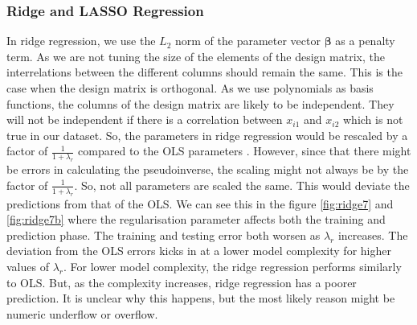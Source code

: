 \subsubsection{Ridge and LASSO Regression}
In ridge regression, we use the $L_2$ norm of the parameter vector $\boldsymbol \beta$ as a penalty term. As we are not tuning the size of the elements of the design matrix, the interrelations between the different columns should remain the same. This is the case when the design matrix is orthogonal. As we use polynomials as basis functions, the columns of the design matrix are likely to be independent. They will not be independent if there is a correlation between $x_{i1}$ and $x_{i2}$ which is not true in our dataset. So, the parameters in ridge regression would be rescaled by a factor of $\frac{1}{1+\lambda_r}$ compared to the OLS parameters \cite{mehta2019high}. However, since that there might be errors in calculating the pseudoinverse, the scaling might not always be by the factor of $\frac{1}{1+\lambda_r}$. So, not all parameters are scaled the same. This would deviate the predictions from that of the OLS. We can see this in the figure \ref{fig:ridge7} and \ref{fig:ridge7b} where the regularisation parameter affects both the training and prediction phase. The training and testing error both worsen as $\lambda_r$ increases. The deviation from the OLS errors kicks in at a lower model complexity for higher values of  $\lambda_r$. For lower model complexity, the ridge regression performs similarly to OLS. But, as the complexity increases, ridge regression has a poorer prediction. It is unclear why this happens, but the most likely reason might be numeric underflow or overflow. 



